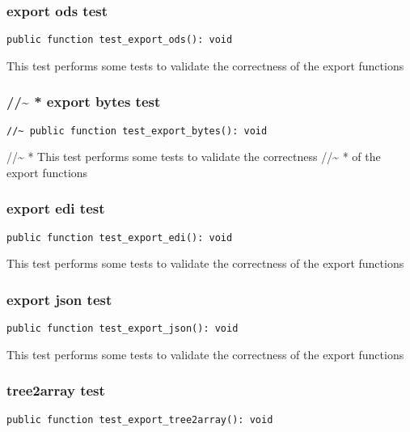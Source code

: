 \documentclass[a4paper]{article}
\begin{document}
\hypertarget{toc179}{}
\subsubsection{export ods test}

\begin{lstlisting}
public function test_export_ods(): void
\end{lstlisting}

This test performs some tests to validate the correctness
of the export functions

\hypertarget{toc180}{}
\subsubsection{//\~{} * export bytes test}

\begin{lstlisting}
//~ public function test_export_bytes(): void
\end{lstlisting}

//\~{} * This test performs some tests to validate the correctness
//\~{} * of the export functions

\hypertarget{toc181}{}
\subsubsection{export edi test}

\begin{lstlisting}
public function test_export_edi(): void
\end{lstlisting}

This test performs some tests to validate the correctness
of the export functions

\hypertarget{toc182}{}
\subsubsection{export json test}

\begin{lstlisting}
public function test_export_json(): void
\end{lstlisting}

This test performs some tests to validate the correctness
of the export functions

\hypertarget{toc183}{}
\subsubsection{tree2array test}

\begin{lstlisting}
public function test_export_tree2array(): void
\end{lstlisting}
\end{document}

